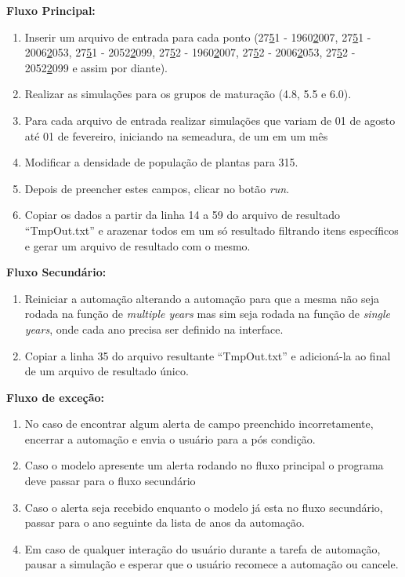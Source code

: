 \documentclass[tg]{mdtufsm}
\begin{document}
	{\bf Fluxo Principal:}
	
	\begin{enumerate}
		\item Inserir um arquivo de entrada para cada ponto (27\underline51 - 1960\underline2007, 27\underline51 - 2006\underline2053, 27\underline51 - 2052\underline2099, 27\underline52 - 1960\underline2007, 27\underline52 - 2006\underline2053, 27\underline52 - 2052\underline2099 e assim por diante).
		\item Realizar as simulações para os grupos de maturação (4.8, 5.5 e 6.0).
		\item Para cada arquivo de entrada realizar simulações que variam de 01 de agosto até 01 de fevereiro, iniciando na semeadura, de um em um mês
		\item Modificar a densidade de população de plantas para 315.
		\item Depois de preencher estes campos, clicar no botão \emph{run}.
		\item Copiar os dados a partir da linha 14 a 59 do arquivo de resultado “TmpOut.txt” e arazenar todos em um só resultado filtrando itens específicos e gerar um arquivo de resultado com o mesmo.
	\end{enumerate}
	
	{\bf Fluxo Secundário:}
	
	\begin{enumerate}
		\item Reiniciar a automação alterando a automação para que a mesma não seja rodada na função de \emph{multiple years} mas sim seja rodada na função de \emph{single years}, onde cada ano precisa ser definido na interface.
		\item Copiar a linha 35 do arquivo resultante “TmpOut.txt” e adicioná-la ao final de um arquivo de resultado único.
	\end{enumerate}
	
	{\bf Fluxo de exceção:}
	
	\begin{enumerate}
		\item No caso de encontrar algum alerta de campo preenchido incorretamente, encerrar a automação e envia o usuário para a pós condição.
		\item Caso o modelo apresente um alerta rodando no fluxo principal o programa deve passar para o fluxo secundário
		\item Caso o alerta seja recebido enquanto o modelo já esta no fluxo secundário, passar para o ano seguinte da lista de anos da automação.
		\item Em caso de qualquer interação do usuário durante a tarefa de automação, pausar a simulação e esperar que o usuário recomece a automação ou cancele.
	\end{enumerate}
	
\end{document}
